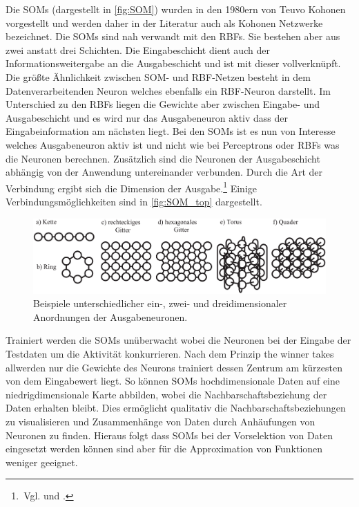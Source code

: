Die SOMs (dargestellt in \autoref{fig:SOM}) wurden in den 1980ern von Teuvo Kohonen vorgestellt und werden daher in der Literatur auch als Kohonen Netzwerke bezeichnet. Die SOMs sind nah verwandt mit den RBFs. Sie bestehen aber aus zwei anstatt drei Schichten. Die Eingabeschicht dient auch der Informationsweitergabe an die Ausgabeschicht und ist mit dieser vollverknüpft. Die größte Ähnlichkeit zwischen SOM- und RBF-Netzen besteht in dem Datenverarbeitenden Neuron welches ebenfalls ein RBF-Neuron darstellt. Im Unterschied zu den RBFs liegen die Gewichte aber zwischen Eingabe- und Ausgabeschicht und es wird nur das Ausgabeneuron aktiv dass der Eingabeinformation am nächsten liegt.
Bei den SOMs ist es nun von Interesse welches Ausgabeneuron aktiv ist und nicht wie bei Perceptrons oder RBFs was die Neuronen berechnen. Zusätzlich sind die Neuronen der Ausgabeschicht abhängig von der Anwendung untereinander verbunden. Durch die Art der Verbindung ergibt sich die Dimension der Ausgabe.\footnote{\,Vgl. \citet[102 ff]{Kruse15} und \citet[153 ff]{dkriesel07}.} Einige Verbindungsmöglichkeiten sind in \autoref{fig:SOM_top} dargestellt.
\begin{figure}[tb]
    \centering
        \includegraphics[width=1\textwidth]{Bilder/SOM/som_top.png}
    \caption{Beispiele unterschiedlicher ein-, zwei- und dreidimensionaler Anordnungen der Ausgabeneuronen.\protect\footnotemark{}}
    \label{fig:SOM_top}
\end{figure}
\addtocounter{footnote}{-1}     %
\addtocounter{Hfootnote}{-1}    %
\wrapfigfoot{}

Trainiert werden die SOMs unüberwacht wobei die Neuronen bei der Eingabe der Testdaten um die Aktivität konkurrieren. Nach dem Prinzip \glqq the winner takes all\grqq werden nur die Gewichte des Neurons trainiert dessen Zentrum am kürzesten von dem Eingabewert liegt.
So können SOMs hochdimensionale Daten auf eine niedrigdimensionale Karte abbilden, wobei die Nachbarschaftsbeziehung der Daten erhalten bleibt. Dies ermöglicht qualitativ die Nachbarschaftsbeziehungen zu visualisieren und Zusammenhänge von Daten durch Anhäufungen von Neuronen zu finden. Hieraus folgt dass SOMs bei der Vorselektion von Daten eingesetzt werden können sind aber für die Approximation von Funktionen weniger geeignet.

